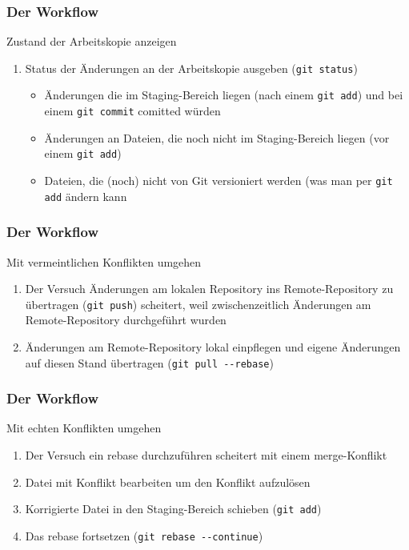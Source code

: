 \documentclass{beamer}
\begin{document}
\begin{frame}
  \frametitle{Der Workflow}
  
  \begin{block}{Zustand der Arbeitskopie anzeigen}
  \begin{enumerate}
  \item Status der Änderungen an der Arbeitskopie ausgeben (\texttt{git status})
    \begin{itemize}
    \item Änderungen die im Staging-Bereich liegen (nach einem \texttt{git add}) und bei einem \texttt{git commit} comitted würden
    \item Änderungen an Dateien, die noch nicht im Staging-Bereich liegen (vor einem \texttt{git add})
    \item Dateien, die (noch) nicht von Git versioniert werden (was man per \texttt{git add} ändern kann
  \end{itemize}
  \end{enumerate}
  \end{block}
  
\end{frame}


\begin{frame}
  \frametitle{Der Workflow}

  \begin{block}{Mit vermeintlichen Konflikten umgehen}
  \begin{enumerate}
  \item Der Versuch Änderungen am lokalen Repository ins Remote-Repository zu übertragen (\texttt{git push}) scheitert, weil zwischenzeitlich Änderungen am Remote-Repository durchgeführt wurden
  \item Änderungen am Remote-Repository lokal einpflegen und eigene Änderungen auf diesen Stand übertragen (\texttt{git pull {-{}-}rebase})
  \end{enumerate}
  \end{block}

\end{frame}


\begin{frame}
  \frametitle{Der Workflow}

  \begin{block}{Mit echten Konflikten umgehen}
  \begin{enumerate}
  \item Der Versuch ein rebase durchzuführen scheitert mit einem merge-Konflikt
  \item Datei mit Konflikt bearbeiten um den Konflikt aufzulösen
  \item Korrigierte Datei in den Staging-Bereich schieben (\texttt{git add})
  \item Das rebase fortsetzen (\texttt{git rebase {-{}-}continue})
  \end{enumerate}
  \end{block}

\end{frame}


\end{document}
